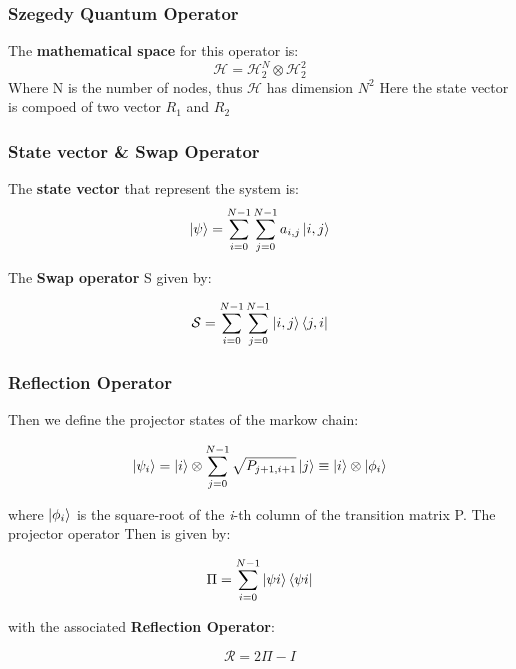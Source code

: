 \documentclass{beamer}
\begin{document}
\begin{frame}
    \frametitle{Szegedy Quantum Operator}
    
    The \textbf{mathematical space} for this operator is:
    \begin{equation}
        \mathcal{H} = \mathcal{H}_{2}^{N} \otimes \mathcal{H}_{2}^{2}
    \end{equation}
    Where N is the number of nodes, thus $\mathcal{H}$ has dimension $N^{2}$ 
    Here the state vector is compoed of two vector $R_{1}$ and $R_{2}$

\end{frame}

\begin{frame}
    \frametitle{State vector \& Swap Operator}
    The \textbf{state vector} that represent the system is:
    \begin{equation}
        \ket{\psi} = \sum_{i=0}^{N-1}\sum_{j=0}^{N-1} a_{i,j}\ket{i,j} 
    \end{equation}
    
    The \textbf{Swap operator} S given by:
    
    \begin{equation}
        \mathcal{S} = \sum_{i=0}^{N-1}\sum_{j=0}^{N-1} \ket{i,j}\bra{j,i} 
    \end{equation}
    
\end{frame}

\begin{frame}
    \frametitle{Reflection Operator}
    Then we define the projector states of the markow chain:
    
    \begin{equation}
        \ket{\psi_{i}} = \ket{i} \otimes \sum_{j=0}^{N-1}\sqrt{P_{j+1,i+1}}\ket{j} \equiv \ket{i} \otimes \ket{\phi_{i}}
    \end{equation}
    
    where $\ket{\phi_{i}}$ is the square-root of the \textit{i}-th column of the transition matrix P. The projector operator Then is given by:
    
    \begin{equation}
        \Pi = \sum_{i=0}^{N-1}\ket{\psi{i}}\bra{\psi{i}}
    \end{equation}
    
    with the associated \textbf{Reflection Operator}:
    
    \begin{equation}
        \mathcal{R} = 2\Pi - I
    \end{equation}
    
\end{frame}
\end{document}
